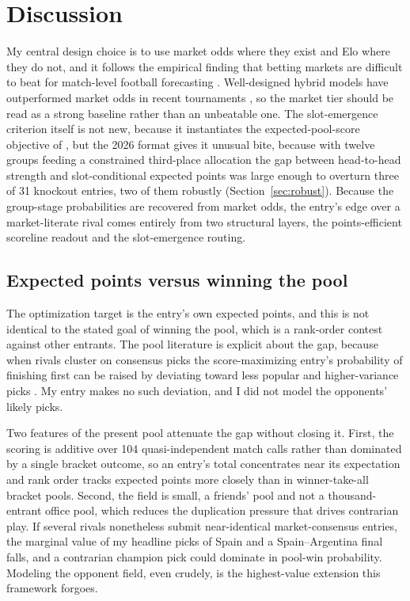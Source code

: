 \documentclass[11pt,letterpaper]{article}
\begin{document}




\section{Discussion}



My central design choice is to use market odds where they exist and Elo where they do not, and it follows the empirical finding that betting markets are difficult to beat for match-level football forecasting \citep{strumbelj2014, leitner2010, hvattum2010}. Well-designed hybrid models have outperformed market odds in recent tournaments \citep{groll2019}, so the market tier should be read as a strong baseline rather than an unbeatable one. The slot-emergence criterion itself is not new, because it instantiates the expected-pool-score objective of \citet{kaplangarstka2001}, but the 2026 format gives it unusual bite, because with twelve groups feeding a constrained third-place allocation the gap between head-to-head strength and slot-conditional expected points was large enough to overturn three of 31 knockout entries, two of them robustly (Section~\ref{sec:robust}). Because the group-stage probabilities are recovered from market odds, the entry's edge over a market-literate rival comes entirely from two structural layers, the points-efficient scoreline readout and the slot-emergence routing.

\subsection{Expected points versus winning the pool}\label{sec:objective}

The optimization target is the entry's own expected points, and this is not identical to the stated goal of winning the pool, which is a rank-order contest against other entrants. The pool literature is explicit about the gap, because when rivals cluster on consensus picks the score-maximizing entry's probability of finishing first can be raised by deviating toward less popular and higher-variance picks \citep{clairletscher2007, kaplangarstka2001}. My entry makes no such deviation, and I did not model the opponents' likely picks.

Two features of the present pool attenuate the gap without closing it. First, the scoring is additive over 104 quasi-independent match calls rather than dominated by a single bracket outcome, so an entry's total concentrates near its expectation and rank order tracks expected points more closely than in winner-take-all bracket pools. Second, the field is small, a friends' pool and not a thousand-entrant office pool, which reduces the duplication pressure that drives contrarian play. If several rivals nonetheless submit near-identical market-consensus entries, the marginal value of my headline picks of Spain and a Spain--Argentina final falls, and a contrarian champion pick could dominate in pool-win probability. Modeling the opponent field, even crudely, is the highest-value extension this framework forgoes.
\end{document}
